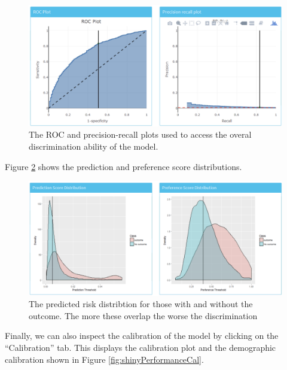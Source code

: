 \documentclass[11pt]{book}
\theoremstyle{definition}
\theoremstyle{definition}
\theoremstyle{definition}
\theoremstyle{remark}
\begin{document}
\begin{figure}

{\centering \includegraphics[width=1\linewidth]{images/PatientLevelPrediction/shiny/shinyPerformanceDisc} 

}

\caption{The ROC and precision-recall plots used to access the overal discrimination ability of the model.}\label{fig:shinyPerformanceDisc}
\end{figure}

Figure \ref{fig:shinyPerformanceDist} shows the prediction and preference score distributions.

\begin{figure}

{\centering \includegraphics[width=1\linewidth]{images/PatientLevelPrediction/shiny/shinyPerformanceDist} 

}

\caption{The predicted risk distribtion for those with and without the outcome. The more these overlap the worse the discrimination}\label{fig:shinyPerformanceDist}
\end{figure}

Finally, we can also inspect the calibration of the model by clicking on the ``Calibration'' tab. This displays the calibration plot and the demographic calibration shown in Figure \ref{fig:shinyPerformanceCal}.
\end{document}

